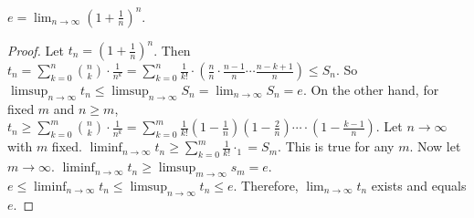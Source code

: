 \begin{theorem}
	\label{thm:3.31}
	$e= \lim_{n\to \infty}{(1+\frac{1}{n})^{n}}$.
	\begin{proof}
		Let $t_n=(1+\frac{1}{n})^{n}$. Then $t_n= \sum_{k=0}^{n}{\binom{n}{k} \cdot \frac{1}{n^{k}}}= \sum_{k=0}^{n}{\frac{1}{k!} \cdot (\frac{n}{n} \cdot \frac{n-1}{n} \cdots \frac{n-k+1}{n})} \le S_n$. So $\limsup_{n\to \infty}{t_n}\le \limsup_{n\to \infty}{S_n}=\lim_{n\to \infty}{S_n}=e$.
		On the other hand, for fixed $m$ and $n\ge m$, $t_n \ge \sum_{k=0}^{m}{\binom{n}{k} \cdot \frac{1}{n^{k}}}= \sum_{k=0}^{m}{\frac{1}{k!} (1-\frac{1}{n}) (1- \frac{2}{n}) \cdots \cdot (1-\frac{k-1}{n})}$. Let $n\to \infty$ with $m$ fixed.
		$\liminf_{n\to \infty}{t_n}\ge \sum_{k=0}^{m}{\frac{1}{k!} \cdot_1}=S_m$. This is true for any $m$.
		Now let $m\to \infty$. $\liminf_{n\to \infty}{t_{n}}\ge  \limsup_{m\to \infty}{s_{m}}=e$.
		$e \le \liminf_{n\to \infty}{t_{n}} \le \limsup_{n\to \infty}{t_{n}}\le e$.
		Therefore, $\lim_{n\to \infty}{t_{n}}$ exists and equals $e$.
	\end{proof}
\end{theorem}

